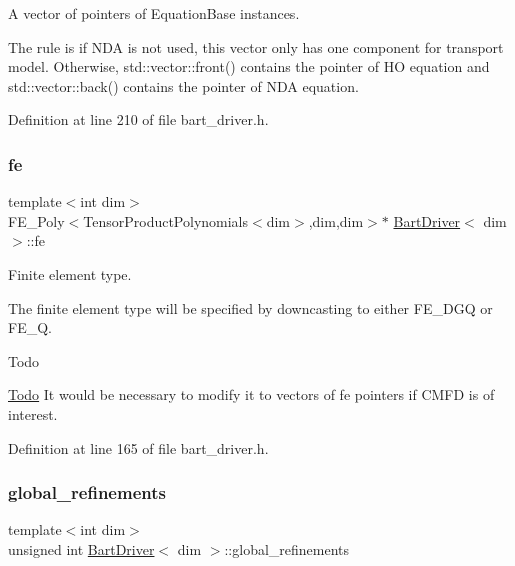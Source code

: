A vector of pointers of Equation\+Base instances. 

The rule is if N\+DA is not used, this vector only has one component for transport model. Otherwise, std\+::vector\+::front() contains the pointer of HO equation and std\+::vector\+::back() contains the pointer of N\+DA equation. 

Definition at line 210 of file bart\+\_\+driver.\+h.

\mbox{\label{class_bart_driver_ac2e63d4ab8a403649e19f4b1acf94c04}} 
\subsubsection{\texorpdfstring{fe}{fe}}
{\footnotesize\ttfamily template$<$int dim$>$ \\
F\+E\+\_\+\+Poly$<$Tensor\+Product\+Polynomials$<$dim$>$,dim,dim$>$$\ast$ \hyperlink{class_bart_driver}{Bart\+Driver}$<$ dim $>$\+::fe\hspace{0.3cm}{\ttfamily [private]}}



Finite element type. 

The finite element type will be specified by downcasting to either F\+E\+\_\+\+D\+GQ or F\+E\+\_\+Q.

\begin{DoxyRefDesc}{Todo}
\item[\hyperlink{todo__todo000001}{Todo}]It would be necessary to modify it to vectors of fe pointers if C\+M\+FD is of interest. \end{DoxyRefDesc}


Definition at line 165 of file bart\+\_\+driver.\+h.

\mbox{\label{class_bart_driver_a1ddb881c78ef92c59f2c686b320c970e}} 
\subsubsection{\texorpdfstring{global\+\_\+refinements}{global\_refinements}}
{\footnotesize\ttfamily template$<$int dim$>$ \\
unsigned int \hyperlink{class_bart_driver}{Bart\+Driver}$<$ dim $>$\+::global\+\_\+refinements\hspace{0.3cm}{\ttfamily [private]}}



